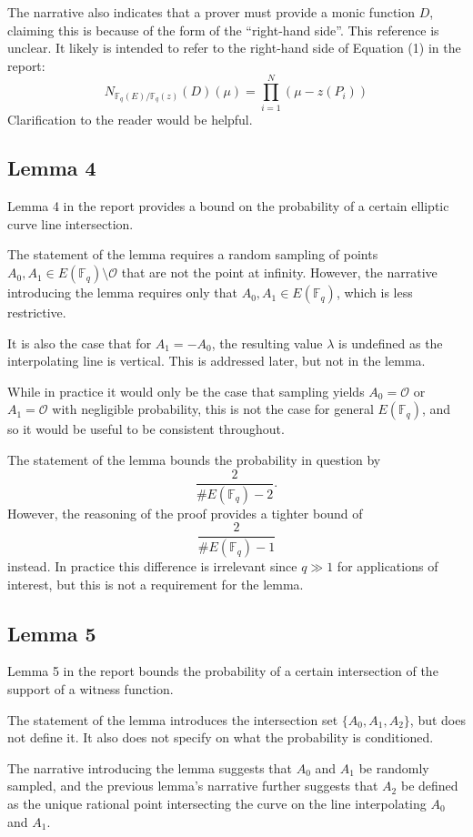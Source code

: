 \documentclass{article}
\begin{document}
The narrative also indicates that a prover must provide a monic function $D$, claiming this is because of the form of the ``right-hand side''.
This reference is unclear.
It likely is intended to refer to the right-hand side of Equation (1) in the report:
$$N_{\mathbb{F}_q(E) / \mathbb{F}_q(z)}(D)(\mu) = \prod_{i=1}^N (\mu - z(P_i))$$
Clarification to the reader would be helpful.


\subsection{Lemma 4}

Lemma 4 in the report provides a bound on the probability of a certain elliptic curve line intersection.

The statement of the lemma requires a random sampling of points $A_0, A_1 \in E(\mathbb{F}_q) \setminus \mathcal{O}$ that are not the point at infinity.
However, the narrative introducing the lemma requires only that $A_0, A_1 \in E(\mathbb{F}_q)$, which is less restrictive.

It is also the case that for $A_1 = -A_0$, the resulting value $\lambda$ is undefined as the interpolating line is vertical.
This is addressed later, but not in the lemma.

While in practice it would only be the case that sampling yields $A_0 = \mathcal{O}$ or $A_1 = \mathcal{O}$ with negligible probability, this is not the case for general $E(\mathbb{F}_q)$, and so it would be useful to be consistent throughout.

The statement of the lemma bounds the probability in question by
$$\frac{2}{\# E(\mathbb{F}_q) - 2}.$$
However, the reasoning of the proof provides a tighter bound of
$$\frac{2}{\# E(\mathbb{F}_q) - 1}$$
instead.
In practice this difference is irrelevant since $q \gg 1$ for applications of interest, but this is not a requirement for the lemma.


\subsection{Lemma 5}

Lemma 5 in the report bounds the probability of a certain intersection of the support of a witness function.

The statement of the lemma introduces the intersection set $\{ A_0, A_1, A_2 \}$, but does not define it.
It also does not specify on what the probability is conditioned.

The narrative introducing the lemma suggests that $A_0$ and $A_1$ be randomly sampled, and the previous lemma's narrative further suggests that $A_2$ be defined as the unique rational point intersecting the curve on the line interpolating $A_0$ and $A_1$.
\end{document}
